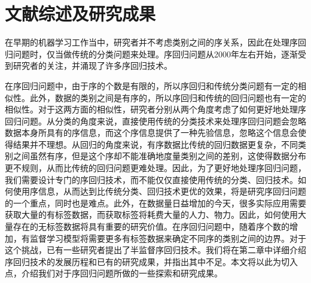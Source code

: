 
\section{文献综述及研究成果}
在早期的机器学习工作当中，研究者并不考虑类别之间的序关系，因此在处理序回归问题时，仅当做传统的分类问题来处理。序回归问题从2000年左右开始，逐渐受到研究者的关注，并涌现了许多序回归技术\citep{frank2001simple}\citep{herbrich1999support}\citep{shashua2002ranking}\citep{chu2005new}\citep{sun2010kernel}\citep{chu2005gaussian}\citep{cheng2008neural}。


在序回归问题中，由于序的个数是有限的，所以序回归和传统分类问题有一定的相似性。此外，数据的类别之间是有序的，所以序回归和传统的回归问题也有一定的相似性。对于这两方面的相似性，研究者分别从两个角度考虑了如何更好地处理序回归问题。从分类的角度来说，直接使用传统的分类技术来处理序回归问题会忽略数据本身所具有的序信息，而这个序信息提供了一种先验信息，忽略这个信息会使得结果并不理想。从回归的角度来说，有序数据比传统的回归数据更复杂，不同类别之间虽然有序，但是这个序却不能准确地度量类别之间的差别，这使得数据分布更不规则，从而比传统的回归问题更难处理。因此，为了更好地处理序回归问题，我们需要设计专门的序回归技术，而不能仅仅直接使用传统的分类、回归技术。如何使用序信息，从而达到比传统分类、回归技术更优的效果，将是研究序回归问题的一个重点，同时也是难点。此外，在数据量日益增加的今天，很多实际应用需要获取大量的有标签数据，而获取标签将耗费大量的人力、物力。因此，如何使用大量存在的无标签数据将具有重要的研究价值。在序回归问题中，随着序个数的增加，有监督学习模型将需要更多有标签数据来确定不同序的类别之间的边界。对于这个挑战，已有一些研究者提出了半监督序回归技术。我们将在第二章中详细介绍序回归技术的发展历程和已有的研究成果，并指出其中不足。本文将以此为切入点，介绍我们对于序回归问题所做的一些探索和研究成果。

